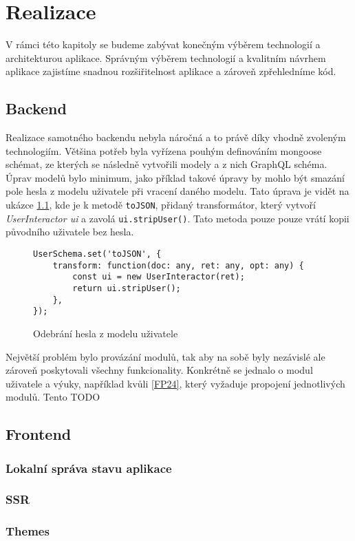 \chapter{Realizace}
\label{ch:implementation}
V rámci této kapitoly se budeme zabývat konečným výběrem technologií a architekturou aplikace. Správným výběrem technologií a kvalitním návrhem aplikace zajistíme snadnou rozšiřitelnost aplikace a zároveň zpřehledníme kód.







\section{Backend}
\label{sc:backend}
Realizace samotného backendu nebyla náročná a to právě díky vhodně zvoleným technologiím. Většina potřeb byla vyřízena pouhým definováním mongoose schémat, ze kterých se následně vytvořili modely a z nich GraphQL schéma. Úprav modelů bylo minimum, jako příklad takové úpravy by mohlo být smazání pole hesla z modelu uživatele při vracení daného modelu. Tato úprava je vidět na ukázce \ref{code:to_json_user}, kde je k metodě \texttt{toJSON}, přidaný transformátor, který vytvoří \emph{UserInteractor ui} a zavolá \texttt{ui.stripUser()}. Tato metoda pouze pouze vrátí kopii původního uživatele bez hesla.

\begin{figure}[h!]
    \centering
    \begin{verbatim}
UserSchema.set('toJSON', {
    transform: function(doc: any, ret: any, opt: any) {
        const ui = new UserInteractor(ret);
        return ui.stripUser();
    },
});
    \end{verbatim}
    \caption{Odebrání hesla z modelu uživatele}
    \label{code:to_json_user}
\end{figure}

Největší problém bylo provázání modulů, tak aby na sobě byly nezávislé ale zároveň poskytovali všechny funkcionality. Konkrétně se jednalo o modul uživatele a výuky, například kvůli \ref{FP24}, který vyžaduje propojení jednotlivých modulů. Tento TODO

\section{Frontend}
\label{sc:frontend}

\subsection{Lokalní správa stavu aplikace}
\label{ss:local_state_management}

\subsection{SSR}
\label{ss:ssr}

\subsection{Themes}
\label{ss:themes}



